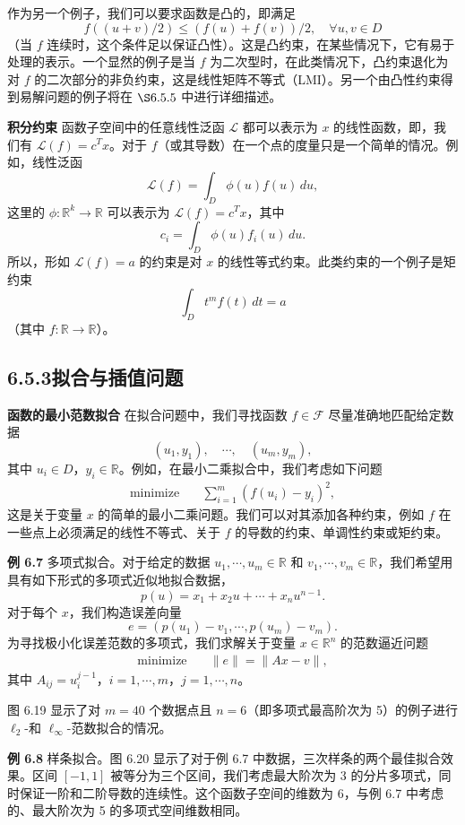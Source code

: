 \documentclass[UTF8, 12pt, fontset=fandol, oneside]{ctexart}
\begin{document}
作为另一个例子，我们可以要求函数是凸的，即满足
\[
f((u+v)/2)\leq (f(u)+f(v))/2,\quad \forall u,v\in D
\]
（当 $f$ 连续时，这个条件足以保证凸性）。这是凸约束，在某些情况下，它有易于处理的表示。一个显然的例子是当 $f$ 为二次型时，在此类情况下，凸约束退化为对 $f$ 的二次部分的非负约束，这是线性矩阵不等式（LMI）。另一个由凸性约束得到易解问题的例子将在 $\S 6.5.5$ 中进行详细描述。

\noindent\textbf{积分约束}\quad
函数子空间中的任意线性泛函 $\mathcal{L}$ 都可以表示为 $x$ 的线性函数，即，我们有 $\mathcal{L}(f)=c^Tx$。对于 $f$（或其导数）在一个点的度量只是一个简单的情况。例如，线性泛函
\[
\mathcal{L}(f)=\int_D \phi(u)f(u)\,du,
\]
这里的 $\phi:\mathbb{R}^k\to\mathbb{R}$ 可以表示为 $\mathcal{L}(f)=c^Tx$，其中
\[
c_i=\int_D \phi(u)f_i(u)\,du.
\]
所以，形如 $\mathcal{L}(f)=a$ 的约束是对 $x$ 的线性等式约束。此类约束的一个例子是矩约束
\[
\int_D t^m f(t)\,dt=a
\]
（其中 $f:\mathbb{R}\to\mathbb{R}$）。

\subsection*{6.5.3\quad 拟合与插值问题}

\noindent\textbf{函数的最小范数拟合}\quad
在拟合问题中，我们寻找函数 $f\in\mathcal{F}$ 尽量准确地匹配给定数据
\[
(u_1,y_1),\quad \cdots,\quad (u_m,y_m),
\]
其中 $u_i\in D$，$y_i\in\mathbb{R}$。例如，在最小二乘拟合中，我们考虑如下问题
\[
\begin{aligned}
\text{minimize}\quad & \sum_{i=1}^m(f(u_i)-y_i)^2,
\end{aligned}
\]
这是关于变量 $x$ 的简单的最小二乘问题。我们可以对其添加各种约束，例如 $f$ 在一些点上必须满足的线性不等式、关于 $f$ 的导数的约束、单调性约束或矩约束。

\noindent\textbf{例 6.7}\quad
多项式拟合。对于给定的数据 $u_1,\cdots,u_m\in\mathbb{R}$ 和 $v_1,\cdots,v_m\in\mathbb{R}$，我们希望用具有如下形式的多项式近似地拟合数据，
\[
p(u)=x_1+x_2u+\cdots+x_nu^{n-1}.
\]
对于每个 $x$，我们构造误差向量
\[
e=(p(u_1)-v_1,\cdots,p(u_m)-v_m).
\]
为寻找极小化误差范数的多项式，我们求解关于变量 $x\in\mathbb{R}^n$ 的范数逼近问题
\[
\begin{aligned}
\text{minimize}\quad & \|e\|=\|Ax-v\|,
\end{aligned}
\]
其中 $A_{ij}=u_i^{j-1}$，$i=1,\cdots,m$，$j=1,\cdots,n$。

图 6.19 显示了对 $m=40$ 个数据点且 $n=6$（即多项式最高阶次为 5）的例子进行 $\ell_2$-和 $\ell_\infty$-范数拟合的情况。

\noindent\textbf{例 6.8}\quad
样条拟合。图 6.20 显示了对于例 6.7 中数据，三次样条的两个最佳拟合效果。区间 $[-1,1]$ 被等分为三个区间，我们考虑最大阶次为 3 的分片多项式，同时保证一阶和二阶导数的连续性。这个函数子空间的维数为 6，与例 6.7 中考虑的、最大阶次为 5 的多项式空间维数相同。
\end{document}
